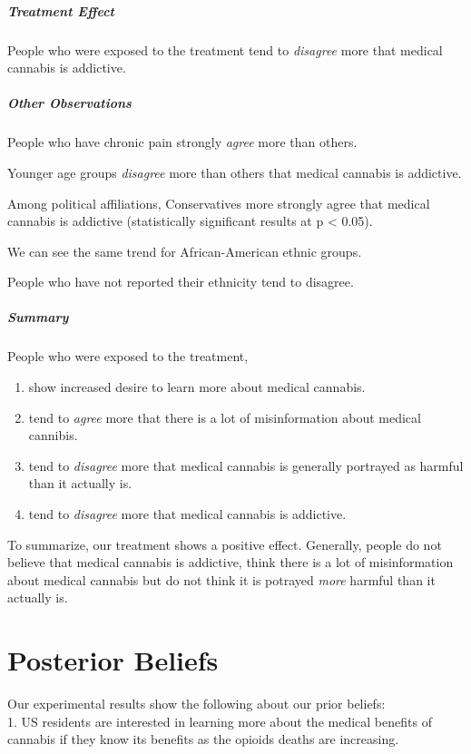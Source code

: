 \documentclass[
]{article}
\begin{document}
\hypertarget{treatment-effect-3}{%
\subparagraph{Treatment Effect}\label{treatment-effect-3}}

People who were exposed to the treatment tend to \emph{disagree} more
that medical cannabis is addictive.

\hypertarget{other-observations-3}{%
\subparagraph{Other Observations}\label{other-observations-3}}

People who have chronic pain strongly \emph{agree} more than others.

Younger age groups \emph{disagree} more than others that medical
cannabis is addictive.

Among political affiliations, Conservatives more strongly agree that
medical cannabis is addictive (statistically significant results at p
\textless{} 0.05).

We can see the same trend for African-American ethnic groups.

People who have not reported their ethnicity tend to disagree.

\hypertarget{summary}{%
\subparagraph{Summary}\label{summary}}

People who were exposed to the treatment,

\begin{enumerate}
\def\labelenumi{\arabic{enumi}.}
\item
  show increased desire to learn more about medical cannabis.
\item
  tend to \emph{agree} more that there is a lot of misinformation about
  medical cannibis.
\item
  tend to \emph{disagree} more that medical cannabis is generally
  portrayed as harmful than it actually is.
\item
  tend to \emph{disagree} more that medical cannabis is addictive.
\end{enumerate}

To summarize, our treatment shows a positive effect. Generally, people
do not believe that medical cannabis is addictive, think there is a lot
of misinformation about medical cannabis but do not think it is potrayed
\emph{more} harmful than it actually is.

\hypertarget{posterior-beliefs}{%
\section{Posterior Beliefs}\label{posterior-beliefs}}

Our experimental results show the following about our prior beliefs:\\
1. US residents are interested in learning more about the medical
benefits of cannabis if they know its benefits as the opioids deaths are
increasing.
\end{document}
